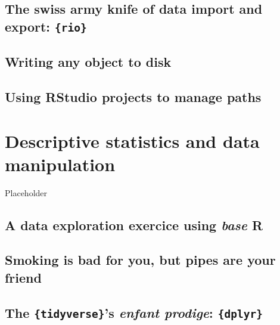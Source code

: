\documentclass[]{gitbook}
\begin{document}
\hypertarget{the-swiss-army-knife-of-data-import-and-export-rio}{%
\subsection{\texorpdfstring{The swiss army knife of data import and export: \texttt{\{rio\}}}{The swiss army knife of data import and export: \{rio\}}}\label{the-swiss-army-knife-of-data-import-and-export-rio}}

\hypertarget{writing-any-object-to-disk}{%
\subsection{Writing any object to disk}\label{writing-any-object-to-disk}}

\hypertarget{using-rstudio-projects-to-manage-paths}{%
\subsection{Using RStudio projects to manage paths}\label{using-rstudio-projects-to-manage-paths}}

\hypertarget{descriptive-statistics-and-data-manipulation}{%
\section{Descriptive statistics and data manipulation}\label{descriptive-statistics-and-data-manipulation}}

Placeholder

\hypertarget{a-data-exploration-exercice-using-base-r}{%
\subsection{\texorpdfstring{A data exploration exercice using \emph{base} R}{A data exploration exercice using base R}}\label{a-data-exploration-exercice-using-base-r}}

\hypertarget{smoking-is-bad-for-you-but-pipes-are-your-friend}{%
\subsection{Smoking is bad for you, but pipes are your friend}\label{smoking-is-bad-for-you-but-pipes-are-your-friend}}

\hypertarget{the-tidyverses-enfant-prodige-dplyr}{%
\subsection{\texorpdfstring{The \texttt{\{tidyverse\}}'s \emph{enfant prodige}: \texttt{\{dplyr\}}}{The \{tidyverse\}'s enfant prodige: \{dplyr\}}}\label{the-tidyverses-enfant-prodige-dplyr}}
\end{document}
